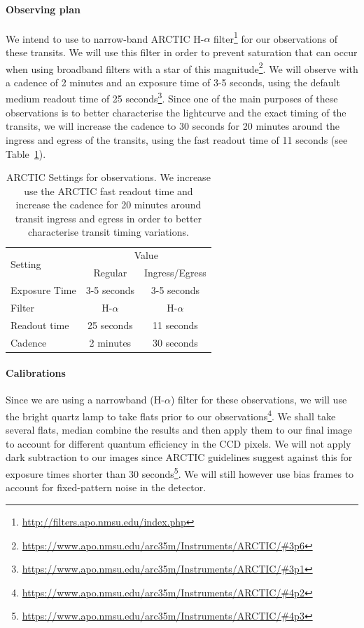 \documentclass[twocolumn]{aastex631}
\begin{document}
\paragraph{Observing plan} We intend to use to narrow-band ARCTIC H-$\alpha$ filter\footnote{\url{http://filters.apo.nmsu.edu/index.php}} for our observations of these transits. We will use this filter in order to prevent saturation that can occur when using broadband filters with a star of this magnitude\footnote{\url{https://www.apo.nmsu.edu/arc35m/Instruments/ARCTIC/\#3p6}}. We will observe with a cadence of 2 minutes and an exposure time of 3-5 seconds, using the default medium readout time of 25 seconds\footnote{\url{https://www.apo.nmsu.edu/arc35m/Instruments/ARCTIC/\#3p1}}. Since one of the main purposes of these observations is to better characterise the lightcurve and the exact timing of the transits, we will increase the cadence to 30 seconds for 20 minutes around the ingress and egress of the transits, using the fast readout time of 11 seconds (see Table~\ref{tab:settings}).

\begin{table}[htb]
    \centering
    \begin{tabular}{l|c|c} 
        \hline
        \multicolumn{1}{l|}{\multirow{2}{*}{Setting}} & \multicolumn{2}{c}{Value}                                         \\ \cline{2-3} 
\multicolumn{1}{l|}{}                         & \multicolumn{1}{c|}{Regular} & \multicolumn{1}{c}{Ingress/Egress} \\
        \hline\hline
        Exposure Time & 3-5 seconds & 3-5 seconds\\
        Filter & H-$\alpha$ & H-$\alpha$ \\
        Readout time & 25 seconds & 11 seconds \\
        Cadence & 2 minutes & 30 seconds \\
        \hline
    \end{tabular}
    \caption{ARCTIC Settings for observations. We increase use the ARCTIC fast readout time and increase the cadence for 20 minutes around transit ingress and egress in order to better characterise transit timing variations.}
    \label{tab:settings}
\end{table}

\paragraph{Calibrations} Since we are using a narrowband (H-$\alpha$) filter for these observations, we will use the bright quartz lamp to take flats prior to our observations\footnote{\url{https://www.apo.nmsu.edu/arc35m/Instruments/ARCTIC/\#4p2}}. We shall take several flats, median combine the results and then apply them to our final image to account for different quantum efficiency in the CCD pixels. We will not apply dark subtraction to our images since ARCTIC guidelines suggest against this for exposure times shorter than 30 seconds\footnote{\url{https://www.apo.nmsu.edu/arc35m/Instruments/ARCTIC/\#4p3}}. We will still however use bias frames to account for fixed-pattern noise in the detector.
\end{document}
